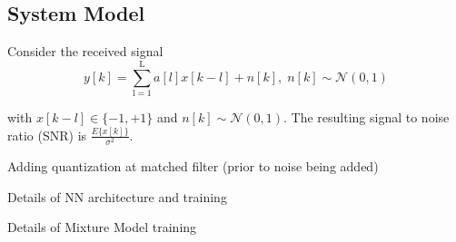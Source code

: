 \documentclass[12pt,a4paper]{report}
\begin{document}
\subsection{System Model}
Consider the received signal 
\begin{equation}
y[k] = \sum_{\mathrm{l=1}}^{\mathrm{L}} a[l]x[k-l] + n[k], \; n[k]  \sim \mathcal{N}(0,1)
\end{equation}

with $x[k-l] \in \{ -1, +1\}$ and $n[k]  \sim \mathcal{N}(0,1)$.  
The resulting signal to noise ratio (SNR) is 
$\frac{E\{x[k]\}}{\sigma^2}$.






Adding quantization at matched filter (prior to noise being added)


Details of NN architecture and training

Details of Mixture Model training
\end{document}

